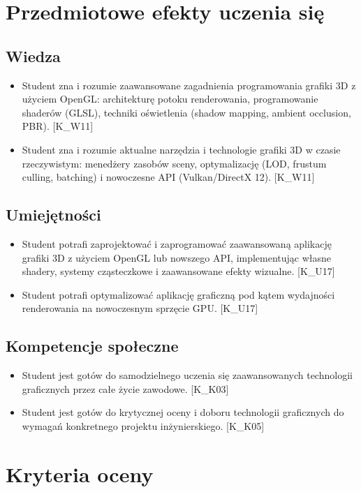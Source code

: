 \documentclass[12pt, a4paper]{article}
\begin{document}
\section{Przedmiotowe efekty uczenia się}

\subsection*{Wiedza}
\begin{itemize}
  \item Student zna i rozumie zaawansowane zagadnienia programowania grafiki 3D z użyciem OpenGL: architekturę potoku renderowania, programowanie shaderów (GLSL), techniki oświetlenia (shadow mapping, ambient occlusion, PBR). [K\_W11]
  \item Student zna i rozumie aktualne narzędzia i technologie grafiki 3D w czasie rzeczywistym: menedżery zasobów sceny, optymalizację (LOD, frustum culling, batching) i nowoczesne API (Vulkan/DirectX 12). [K\_W11]
\end{itemize}

\subsection*{Umiejętności}
\begin{itemize}
  \item Student potrafi zaprojektować i zaprogramować zaawansowaną aplikację grafiki 3D z użyciem OpenGL lub nowszego API, implementując własne shadery, systemy cząsteczkowe i zaawansowane efekty wizualne. [K\_U17]
  \item Student potrafi optymalizować aplikację graficzną pod kątem wydajności renderowania na nowoczesnym sprzęcie GPU. [K\_U17]
\end{itemize}

\subsection*{Kompetencje społeczne}
\begin{itemize}
  \item Student jest gotów do samodzielnego uczenia się zaawansowanych technologii graficznych przez całe życie zawodowe. [K\_K03]
  \item Student jest gotów do krytycznej oceny i doboru technologii graficznych do wymagań konkretnego projektu inżynierskiego. [K\_K05]
\end{itemize}

\section{Kryteria oceny}
\end{document}

